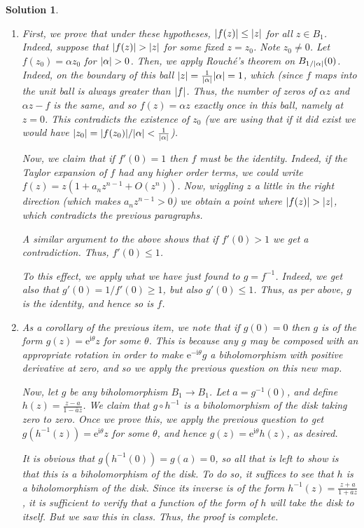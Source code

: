 \documentclass{article}
\theoremstyle{nonumberplain}
\newtheorem{sol}{Solution}
\newcommand{\I}{\mathrm{i}}
\newcommand{\e}{\mathrm{e}}
\newcommand{\conj}[1]{\overline{#1}}
\DeclarePairedDelimiter{\abs}{\lvert}{\rvert}
\begin{document}
\begin{sol}
\leavevmode
\begin{enumerate}
\item First, we prove that under these hypotheses, $\abs{f(z)} \leq \abs z$ for all $z \in B_1$. Indeed, suppose that $\abs{f(z)} > \abs z$ for some fixed $z = z_0$. Note $z_0 \neq 0$. Let $f(z_0) = \alpha z_0$ for $\abs \alpha > 0$. Then, we apply Rouché's theorem on $B_{1/\abs{\alpha}}(0)$. Indeed, on the boundary of this ball $\abs{z} = \frac1{\abs \alpha} \abs\alpha = 1$, which (since $f$ maps into the unit ball is always greater than $\abs f$. Thus, the number of zeros of $\alpha z$ and $\alpha z - f$ is the same, and so $f(z) = \alpha z$ exactly once in this ball, namely at $z = 0$. This contradicts the existence of $z_0$ (we are using that if it did exist we would have $\abs{z_0} = \abs{f(z_0)} / \abs \alpha < \frac1{\abs \alpha}$).

Now, we claim that if $f'(0) = 1$ then $f$ must be the identity. Indeed, if the Taylor expansion of $f$ had any higher order terms, we could write $f(z) = z (1 + a_n z^{n-1} + O(z^{n}))$. Now, wiggling $z$ a little in the right direction (which makes $a_n z^{n-1} > 0$) we obtain a point where $\abs{f(z)} > \abs z$, which contradicts the previous paragraphs.

A similar argument to the above shows that if $f'(0) > 1$ we get a contradiction. Thus, $f'(0) \leq 1$.

To this effect, we apply what we have just found to $g = f^{-1}$. Indeed, we get also that $g'(0) = 1/f'(0) \geq 1$, but also $g'(0) \leq 1$. Thus, as per above, $g$ is the identity, and hence so is $f$.

\item As a corollary of the previous item, we note that if $g(0) = 0$ then $g$ is of the form $g(z) = \e^{\I \theta} z$ for some $\theta$. This is because any $g$ may be composed with an appropriate rotation in order to make $\e^{-\I \theta} g$ a biholomorphism with positive derivative at zero, and so we apply the previous question on this new map.

Now, let $g$ be any biholomorphism $B_1 \to B_1$. Let $a = g^{-1}(0)$, and define $h(z) = \frac{z-a}{1-\conj a z}$. We claim that $g \circ h^{-1}$ is a biholomorphism of the disk taking zero to zero. Once we prove this, we apply the previous question to get $g(h^{-1}(z)) = \e^{\I \theta} z$ for some $\theta$, and hence $g(z) = \e^{\I \theta} h(z)$, as desired.

It is obvious that $g(h^{-1}(0)) = g(a) = 0$, so all that is left to show is that this is a biholomorphism of the disk. To do so, it suffices to see that $h$ is a biholomorphism of the disk. Since its inverse is of the form $h^{-1}(z) = \frac{z+a}{1+\conj a z}$, it is sufficient to verify that a function of the form of $h$ will take the disk to itself. But we saw this in class. Thus, the proof is complete.


\end{enumerate}
\end{sol}
\end{document}
